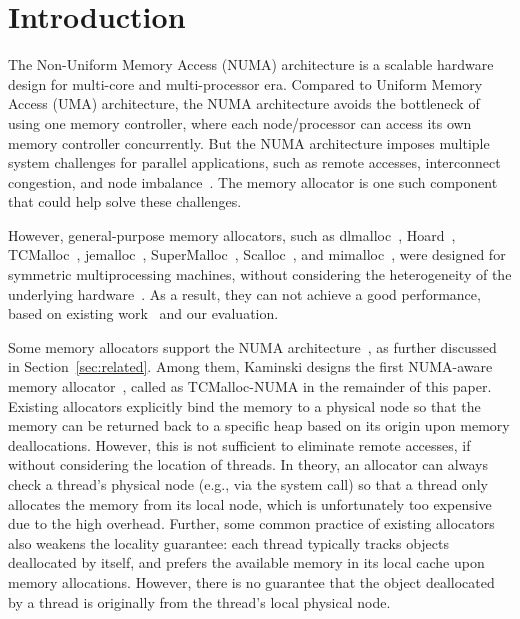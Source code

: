 
\section{Introduction}
\label{sec:intro}


The Non-Uniform Memory Access (NUMA) architecture is a scalable hardware design for multi-core and multi-processor era. Compared to Uniform Memory Access (UMA) architecture, the NUMA architecture avoids the bottleneck of using one memory controller, where each node/processor can access its own memory controller concurrently. But the NUMA architecture imposes multiple system challenges for parallel applications, such as remote accesses, interconnect congestion, and node imbalance~\cite{Blagodurov:2011:CNC:2002181.2002182}. 
The memory allocator is one such component that could help solve these challenges.   

However, general-purpose memory allocators, such as dlmalloc~\cite{dlmalloc},  Hoard~\cite{Hoard}, TCMalloc~\cite{tcmalloc}, jemalloc~\cite{jemalloc}, SuperMalloc~\cite{supermalloc}, Scalloc~\cite{Scalloc}, and mimalloc~\cite{mimalloc}, were designed for symmetric multiprocessing machines, without  considering the heterogeneity of the underlying hardware~\cite{mimalloc}. As a result, they can not achieve a good performance, based on existing work~\cite{tcmallocnew, yang2019jarena} and our evaluation.

Some memory allocators support the NUMA architecture~\cite{tcmallocnew, kim2013node, yang2019jarena, mimalloc}, as further discussed in Section~\ref{sec:related}. Among them, Kaminski designs the first NUMA-aware memory allocator~\cite{tcmallocnew}, called as TCMalloc-NUMA in the remainder of this paper.  %
Existing allocators explicitly bind the memory to a physical node so that the memory can be returned back to a specific heap based on its origin upon memory deallocations. However, this is not sufficient to eliminate remote accesses, if without considering the location of threads.
In theory, an allocator can always check a thread's physical node (e.g., via the system call) so that a thread only allocates the memory from its local node, which is unfortunately too expensive due to the high overhead. Further, some common practice of existing allocators also weakens the locality guarantee: each thread typically tracks objects deallocated by itself, and prefers the available memory in its local cache upon memory allocations. However, there is no guarantee that the object deallocated by a thread is originally from the thread's local physical node. 


